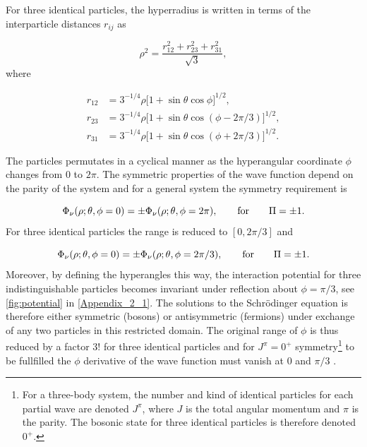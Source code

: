 For three identical particles, the hyperradius is written in terms of the interparticle distances $r_{ij}$ as

\begin{equation}
\rho^2 = \frac{r_{12}^2+r_{23}^2+r_{31}^2}{\sqrt{3}},
\end{equation}
where 

\begin{equation}
\begin{aligned}
r_{12} &= 3^{-1/4}\rho\big[1+\sin\theta\cos\phi\big]^{1/2},\\
r_{23} &= 3^{-1/4}\rho\big[1 + \sin\theta\cos(\phi-2\pi/3)\big]^{1/2},\\
r_{31} &= 3^{-1/4}\rho\big[1 + \sin\theta\cos(\phi + 2\pi/3)\big]^{1/2}.
\end{aligned}
\end{equation}

The particles permutates in a cyclical manner as the hyperangular coordinate $\phi$ changes from $0$ to $2\pi$. The symmetric properties of the wave function depend on the parity of the system and for a general system the symmetry requirement is

\begin{equation}
\Phi_{\nu}(\rho;\theta,\phi = 0) = \pm \Phi_{\nu}(\rho;\theta,\phi = 2\pi), \qquad \text{for} \qquad \Pi = \pm 1.\\
\end{equation}
For three identical particles the range is reduced to $[0,2\pi/3]$ and 

\begin{equation}
\Phi_{\nu}(\rho;\theta,\phi = 0) = \pm \Phi_{\nu}(\rho;\theta,\phi = 2\pi/3), \qquad \text{for} \qquad \Pi = \pm 1.\\
\end{equation}
Moreover, by defining the hyperangles this way, the interaction potential for three indistinguishable particles becomes invariant under reflection about $\phi=\pi/3$, see \cref{fig:potential} in \cref{Appendix_2_1}. The solutions to the Schr{\"o}dinger equation is therefore either symmetric (bosons) or antisymmetric (fermions) under exchange of any two particles in this restricted domain. The original range of $\phi$ is thus reduced by a factor $3!$ for three identical particles and for $J^{\pi} = 0^+$  symmetry\footnote{For a three-body system, the number and kind of identical particles for each partial wave are denoted $J^{\pi}$, where $J$ is the total angular momentum and $\pi$ is the parity. The bosonic state for three identical particles is therefore denoted $0^+$.} to be fullfilled the $\phi$ derivative of the wave function must vanish at $0$ and $\pi/3$ \cite{EsryGreeneSuno2001}.

